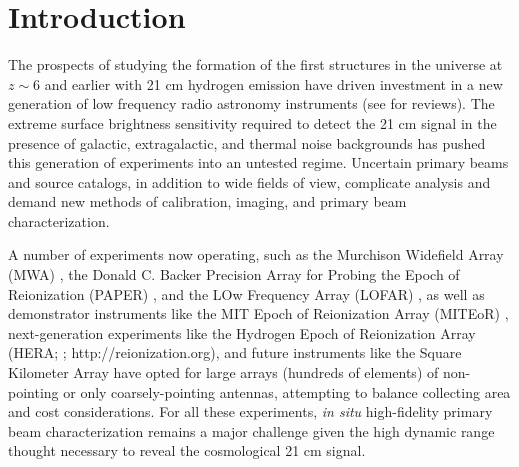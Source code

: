 \section{Introduction}

The prospects of studying the formation of the first structures in the universe at $z\sim6$ and earlier with 21 cm hydrogen emission have driven investment in a new generation of low frequency radio astronomy instruments (see \citet{FurlanettoReview, miguelreview, PritchardLoebReview, aviBook, zaroubi} for reviews). The extreme surface brightness sensitivity required to detect the 21 cm signal in the presence of galactic, extragalactic, and thermal noise backgrounds has pushed this generation of experiments into an untested regime. Uncertain primary beams and source catalogs, in addition to wide fields of view, complicate analysis and demand new methods of calibration, imaging, and primary beam characterization. 

A number of experiments now operating, such as the Murchison Widefield Array (MWA) \citep{lonsdale09,tingay13,mwascience}, the Donald C. Backer Precision Array for Probing the Epoch of Reionization (PAPER) \citep{parsons14}, and the LOw Frequency Array (LOFAR) \citep{lofar}, as well as demonstrator instruments like the MIT Epoch of Reionization Array (MITEoR) \citep{zheng14}, next-generation experiments like the Hydrogen Epoch of Reionization Array (HERA; \citet{PoberNextGen}; http://reionization.org), and future instruments like the Square Kilometer Array \citep{ska} have opted for large arrays (hundreds of elements) of non-pointing or only coarsely-pointing antennas, attempting to balance collecting area and cost considerations. For all these experiments, \textit{in situ} high-fidelity primary beam characterization remains a major challenge given the high dynamic range \citep[e.g.][]{AaronSensitivity, beardsley13, nithya13, PoberNextGen} thought necessary to reveal the cosmological 21 cm signal. 

